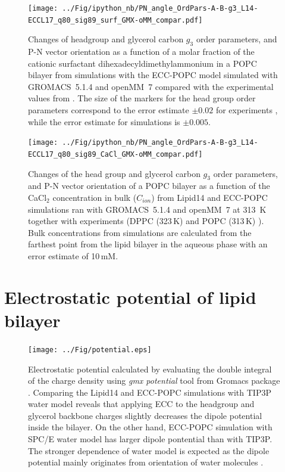 \documentclass[journal=jpcbfk]{achemso}
\begin{document}
\begin{figure}[!p]
  \centering
  \texttt{[image: ../Fig/ipython\_nb/PN\_angle\_OrdPars-A-B-g3\_L14-ECCL17\_q80\_sig89\_surf\_GMX-oMM\_compar.pdf]}
  \caption{\label{fig:ordPars_surf_GMX_oMM_compar}
    Changes of headgroup and glycerol carbon $g_3$ order parameters, and P-N vector orientation as a function of
    a molar fraction of the cationic surfactant dihexadecyldimethylammonium in a POPC bilayer
    from simulations with the ECC-POPC model
    simulated with GROMACS~5.1.4 \cite{Abraham15} and openMM~7 \cite{openmm7} 
    compared with the experimental values from \cite{scherer89}.
    The size of the markers for the head group order parameters correspond to
    the error estimate $\pm 0.02$ for experiments \cite{botan15,ollila16},
    while the error estimate for simulations is $\pm 0.005$.
  }
\end{figure}

\begin{figure}[!p]
  \centering
  \texttt{[image: ../Fig/ipython\_nb/PN\_angle\_OrdPars-A-B-g3\_L14-ECCL17\_q80\_sig89\_CaCl\_GMX-oMM\_compar.pdf]}
  \caption{\label{fig:ordPars_cacl_GMX_oMM_compar}
    Changes of the head group and glycerol carbon $g_3$ order parameters, and P-N vector orientation of a POPC bilayer 
    as a function of the CaCl$_2$ concentration in bulk ($C_{ion}$)
    from Lipid14 \cite{dickson14} and ECC-POPC simulations ran
    with GROMACS~5.1.4 \cite{Abraham15} and openMM~7 \cite{openmm7} at 313~K
    together with experiments (DPPC (323\,K) \cite{akutsu81} and POPC (313\,K) \cite{altenbach84}). 
    Bulk concentrations from simulations are calculated 
    from the farthest point from the lipid bilayer in the aqueous phase
    with an error estimate of 10\,mM.
  }
\end{figure}

\newpage
\section{Electrostatic potential of lipid bilayer}
\begin{figure}[!h]
  \centering
  \texttt{[image: ../Fig/potential.eps]}
  \caption{\label{potential}
    Electrostatic potential calculated by evaluating the double integral of the charge density
    using {\it gmx potential} tool from Gromacs package \cite{gromacsMANUAL}.
    Comparing the Lipid14 and ECC-POPC simulations with TIP3P water model
    reveals that applying ECC to the headgroup and glycerol backbone charges slightly decreases
    the dipole potential inside the bilayer. On the other hand, ECC-POPC simulation
    with SPC/E water model has larger dipole pontential than with TIP3P.
    The stronger dependence of water model is expected as the dipole potential
    mainly originates from orientation of water molecules \cite{gawrisch92}.
  }
\end{figure}
\end{document}
